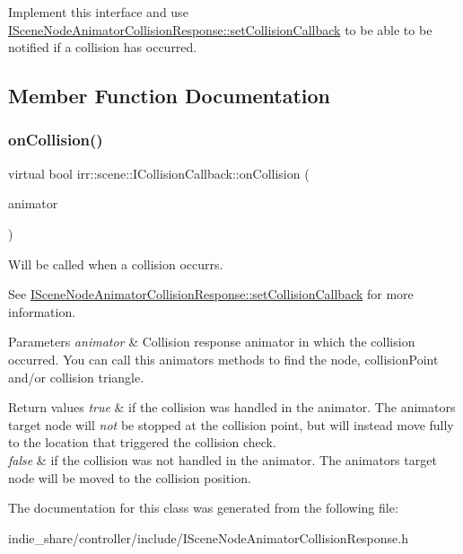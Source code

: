 Implement this interface and use \hyperlink{classirr_1_1scene_1_1ISceneNodeAnimatorCollisionResponse_a2b97f977b446200c5dd22230aec5d275}{I\+Scene\+Node\+Animator\+Collision\+Response\+::set\+Collision\+Callback} to be able to be notified if a collision has occurred. 

\subsection{Member Function Documentation}
\mbox{\label{classirr_1_1scene_1_1ICollisionCallback_a35791df17defc6fd301dccef1cae596a}} 
\subsubsection{\texorpdfstring{on\+Collision()}{onCollision()}}
{\footnotesize\ttfamily virtual bool irr\+::scene\+::\+I\+Collision\+Callback\+::on\+Collision (\begin{DoxyParamCaption}\item[{const \hyperlink{classirr_1_1scene_1_1ISceneNodeAnimatorCollisionResponse}{I\+Scene\+Node\+Animator\+Collision\+Response} \&}]{animator }\end{DoxyParamCaption})\hspace{0.3cm}{\ttfamily [pure virtual]}}



Will be called when a collision occurrs. 

See \hyperlink{classirr_1_1scene_1_1ISceneNodeAnimatorCollisionResponse_a2b97f977b446200c5dd22230aec5d275}{I\+Scene\+Node\+Animator\+Collision\+Response\+::set\+Collision\+Callback} for more information. 
\begin{DoxyParams}{Parameters}
{\em animator} & Collision response animator in which the collision occurred. You can call this animator\textquotesingle{}s methods to find the node, collision\+Point and/or collision triangle. \\
\hline
\end{DoxyParams}

\begin{DoxyRetVals}{Return values}
{\em true} & if the collision was handled in the animator. The animator\textquotesingle{}s target node will {\itshape not} be stopped at the collision point, but will instead move fully to the location that triggered the collision check. \\
\hline
{\em false} & if the collision was not handled in the animator. The animator\textquotesingle{}s target node will be moved to the collision position. \\
\hline
\end{DoxyRetVals}


The documentation for this class was generated from the following file\+:\begin{DoxyCompactItemize}
\item 
indie\+\_\+share/controller/include/I\+Scene\+Node\+Animator\+Collision\+Response.\+h\end{DoxyCompactItemize}
